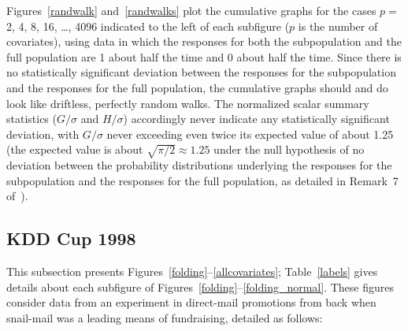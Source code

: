 \documentclass{article}
\begin{document}
Figures~\ref{randwalk} and~\ref{randwalks} plot the cumulative graphs
for the cases $p =$ 2, 4, 8, 16, \dots, 4096 indicated to the left
of each subfigure ($p$ is the number of covariates),
using data in which the responses for both the subpopulation
and the full population are 1 about half the time and 0 about half the time.
Since there is no statistically significant deviation
between the responses for the subpopulation
and the responses for the full population,
the cumulative graphs should and do look like driftless,
perfectly random walks.
The normalized scalar summary statistics ($G/\sigma$ and $H/\sigma$)
accordingly never indicate any statistically significant deviation,
with $G/\sigma$ never exceeding even twice its expected value of about 1.25
(the expected value is about $\sqrt{\pi/2} \approx 1.25$
under the null hypothesis of no deviation
between the probability distributions underlying the responses
for the subpopulation and the responses for the full population,
as detailed in Remark~7 of~\cite{tygert_full}).


\subsection{KDD Cup 1998}
\label{kddcup98}

This subsection presents Figures~\ref{folding}--\ref{allcovariates};
Table~\ref{labels} gives details about each subfigure
of Figures~\ref{folding}--\ref{folding_normal}.
These figures consider data from an experiment in direct-mail promotions
from back when snail-mail was a leading means of fundraising,
detailed as follows:
\end{document}
